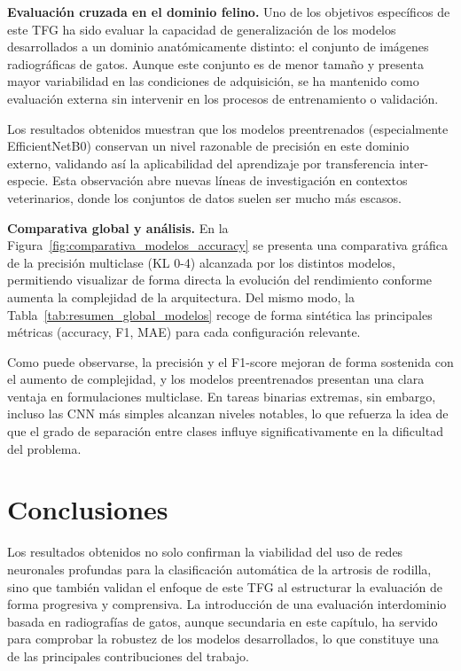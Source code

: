 \documentclass[11pt,spanish,listoffigures,listoftables]{tfgetsinf}
\begin{document}
\textbf{Evaluación cruzada en el dominio felino.}
Uno de los objetivos específicos de este TFG ha sido evaluar la capacidad de generalización de los modelos desarrollados a un dominio anatómicamente distinto: el conjunto de imágenes radiográficas de gatos. Aunque este conjunto es de menor tamaño y presenta mayor variabilidad en las condiciones de adquisición, se ha mantenido como evaluación externa sin intervenir en los procesos de entrenamiento o validación.

Los resultados obtenidos muestran que los modelos preentrenados (especialmente EfficientNetB0) conservan un nivel razonable de precisión en este dominio externo, validando así la aplicabilidad del aprendizaje por transferencia inter-especie. Esta observación abre nuevas líneas de investigación en contextos veterinarios, donde los conjuntos de datos suelen ser mucho más escasos.

\textbf{Comparativa global y análisis.}
En la Figura~\ref{fig:comparativa_modelos_accuracy} se presenta una comparativa gráfica de la precisión multiclase (KL 0-4) alcanzada por los distintos modelos, permitiendo visualizar de forma directa la evolución del rendimiento conforme aumenta la complejidad de la arquitectura. Del mismo modo, la Tabla~\ref{tab:resumen_global_modelos} recoge de forma sintética las principales métricas (accuracy, F1, MAE) para cada configuración relevante.


Como puede observarse, la precisión y el F1-score mejoran de forma sostenida con el aumento de complejidad, y los modelos preentrenados presentan una clara ventaja en formulaciones multiclase. En tareas binarias extremas, sin embargo, incluso las CNN más simples alcanzan niveles notables, lo que refuerza la idea de que el grado de separación entre clases influye significativamente en la dificultad del problema.

\section{Conclusiones}
Los resultados obtenidos no solo confirman la viabilidad del uso de redes neuronales profundas para la clasificación automática de la artrosis de rodilla, sino que también validan el enfoque de este TFG al estructurar la evaluación de forma progresiva y comprensiva. La introducción de una evaluación interdominio basada en radiografías de gatos, aunque secundaria en este capítulo, ha servido para comprobar la robustez de los modelos desarrollados, lo que constituye una de las principales contribuciones del trabajo.
\end{document}
